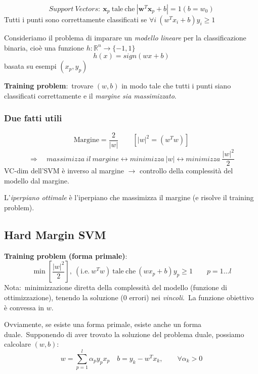 \begin{definition}
	\[\mathit{Support\ Vectors}:\ \mathbf{x}_p\ \mathrm{tale\ che}\ |\mathbf{w}^T\mathbf{x}_p +b| = 1  (b=w_0)\]
	Tutti i punti sono correttamente classificati se $\forall i\ (w^T x_i +b)y_i \geq 1 $
\end{definition}

\noindent Consideriamo il problema di imparare un \textit{modello lineare} per la classificazione binaria, cioè una funzione $h: \mathbb{R}^n \rightarrow \{-1,1\}$
\[h(x) = \mathit{sign}(wx + b )\]
basata su esempi $(x_p, y_p)$

\vspace{12pt}
\noindent\textbf{Training problem}:\ trovare $(w, b)$ in modo tale che tutti i punti siano classificati correttamente e il \textit{margine sia massimizzato}.

\subsubsection{Due fatti utili}

\[\mathrm{Margine} = \frac{2}{|w|}\qquad \left[|w|^ 2 = (w^Tw)\right]\]
\[\Rightarrow\quad\mathit{massimizza\ il\ margine} \leftrightarrow \mathit{minimizza}\ |w| \leftrightarrow \mathit{minimizza}\ \frac{|w|^2}{2} \]
VC-dim dell'SVM è inverso al margine $\rightarrow$ controllo della complessità del modello dal margine.\

\vspace{12pt}

\noindent L'\textit{iperpiano ottimale} è l'iperpiano che massimizza il margine (e risolve il training problem).

\subsection{Hard Margin SVM}

\textbf{Training problem (forma primale)}:
\[\min\left[\frac{|w|^2}{2}\right],\ (\mathrm{i.e.}\ w^Tw)\ \mathrm{tale\ che}\ (wx_p + b) y_p \geq 1\qquad p = 1 \dots l\]
Nota:\ minimizzazione diretta della complessità del modello (funzione di ottimizzazione), tenendo la soluzione (0 errori) nei \textit{vincoli}.\
La funzione obiettivo è convessa in $w$.

Ovviamente, se esiste una forma primale, esiste anche un forma duale.\
Supponendo di aver trovato la soluzione del problema duale, possiamo calcolare $(w,b)$:
\[w = \sum_{p=1}^l\alpha_py_px_p\quad b = y_k- w^Tx_k, \qquad \forall\alpha_k>0\]

